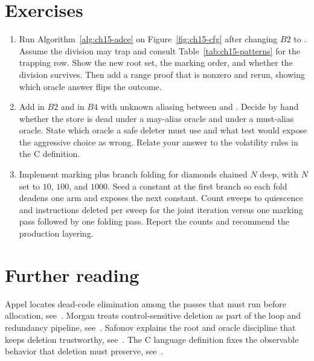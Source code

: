 \section{Exercises}
\label{sec:ch15-exercises}

\begin{enumerate}
\item \label{ex:ch15-hand-mark} Run Algorithm~\ref{alg:ch15-adce} on Figure~\ref{fig:ch15-cfg} after changing $B2$ to .
Assume the division may trap and consult Table~\ref{tab:ch15-patterns} for the trapping row.
Show the new root set, the marking order, and whether the division survives.
Then add a range proof that  is nonzero and rerun, showing which oracle answer flips the outcome.
\item \label{ex:ch15-alias-trap} Add  in $B2$ and  in $B4$ with unknown aliasing between  and .
Decide by hand whether the store is dead under a may-alias oracle and under a must-alias oracle.
State which oracle a safe deleter must use and what test would expose the aggressive choice as wrong.
Relate your answer to the volatility rules in the C definition.
\item \label{ex:ch15-cascade-measure} Implement marking plus branch folding for diamonds chained $N$ deep, with $N$ set to $10$, $100$, and $1000$.
Seed a constant at the first branch so each fold deadens one arm and exposes the next constant.
Count sweeps to quiescence and instructions deleted per sweep for the joint iteration versus one marking pass followed by one folding pass.
Report the counts and recommend the production layering.
\end{enumerate}

\section{Further reading}
\label{sec:ch15-reading}

Appel locates dead-code elimination among the passes that must run before allocation, see~\cite{appel-1998-modern}.
Morgan treats control-sensitive deletion as part of the loop and redundancy pipeline, see~\cite{morgan-1998-optimizing}.
Safonov explains the root and oracle discipline that keeps deletion trustworthy, see~\cite{safonov-2010-trustworthy}.
The C language definition fixes the observable behavior that deletion must preserve, see~\cite{wg14-2011-c11}.
